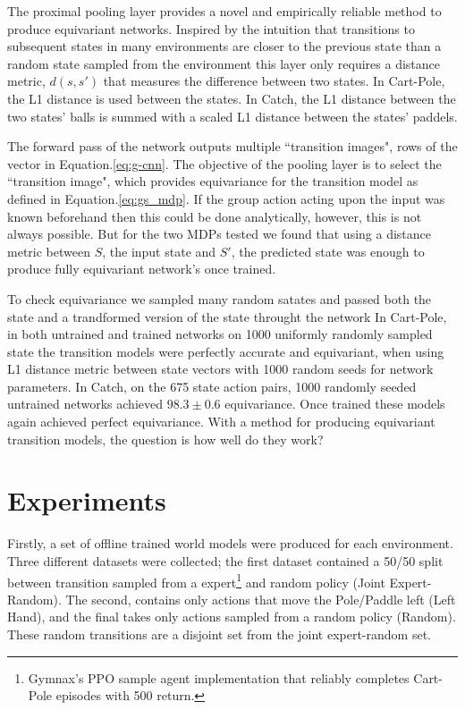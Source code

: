 \documentclass[mlabstract]{jmlr}
\begin{document}
The proximal pooling layer provides a novel and empirically reliable method to produce equivariant networks. Inspired by the intuition that transitions to subsequent states in many environments are closer to the previous state than a random state sampled from the environment this layer only requires a distance metric, $d(s, s')$ that measures the difference between two states. In Cart-Pole, the L1 distance is used between the states. In Catch, the L1 distance between the two states' balls is summed with a scaled L1 distance between the states' paddels.

The forward pass of the network outputs multiple ``transition images", rows of the vector in Equation.\ref{eq:g-cnn}. The objective of the pooling layer is to select the ``transition image", which provides equivariance for the transition model as defined in Equation.\ref{eq:gs_mdp}. If the group action acting upon the input was known beforehand then this could be done analytically, however, this is not always possible. But for the two MDPs tested we found that using a distance metric between $S$, the input state and $S'$, the predicted state was enough to produce fully equivariant network's once trained.

To check equivariance we sampled many random satates and passed both the state and a trandformed version of the state throught the network In Cart-Pole, in both untrained and trained networks on 1000 uniformly randomly sampled state the transition models were perfectly accurate and equivariant, when using L1 distance metric between state vectors with 1000 random seeds for network parameters. In Catch, on the 675 state action pairs, 1000 randomly seeded untrained networks achieved $98.3 \pm 0.6$ equivariance. Once trained these models again achieved perfect equivariance. With a method for producing equivariant transition models, the question is how well do they work?

\section{Experiments}

Firstly, a set of offline trained world models were produced for each environment. Three different datasets were collected; the first dataset contained a 50/50 split between transition sampled from a expert\footnote{Gymnax's PPO sample agent implementation that reliably completes Cart-Pole episodes with 500 return.} and random policy (Joint Expert-Random). The second, contains only actions that move the Pole/Paddle left (Left Hand), and the final takes only actions sampled from a random policy (Random). These random transitions are a disjoint set from the joint expert-random set.
\end{document}

